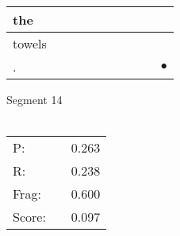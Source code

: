 \documentclass[landscape]{article}
\newcommand{\ssp}{\hspace{2pt}}
\newcommand{\mex}{\cellcolor{g}$\bullet$}
\begin{document}
\begin{tabular}{|l|p{10pt}|p{10pt}|p{10pt}|p{10pt}|p{10pt}|p{10pt}|p{10pt}|p{10pt}|p{10pt}|}
\hline
\ssp the \ssp&\hspace{2pt}&\hspace{2pt}&\hspace{2pt}&\hspace{2pt}&\hspace{2pt}&\hspace{2pt}&\hspace{2pt}&\hspace{2pt}&\hspace{2pt}\\
\hline
\ssp towels \ssp&\hspace{2pt}&\hspace{2pt}&\hspace{2pt}&\hspace{2pt}&\hspace{2pt}&\hspace{2pt}&\hspace{2pt}&\hspace{2pt}&\hspace{2pt}\\
\hline
\ssp \cellcolor{ref8}. \ssp&\hspace{2pt}&\hspace{2pt}&\hspace{2pt}&\hspace{2pt}&\hspace{2pt}&\hspace{2pt}&\hspace{2pt}&\hspace{2pt}&\hspace{2pt}\mex\\
\hline
\end{tabular}

\vspace{6pt}
\noindent Segment 14\\\\
\noindent\begin{tabular}{lm{12pt}r}
\hline
P:&&0.263\\
R:&&0.238\\
Frag:&&0.600\\
Score:&&0.097\\
\end{tabular}

\newpage
\end{document}
